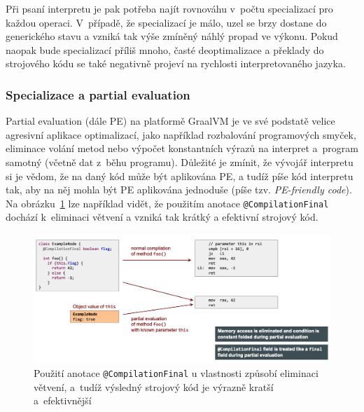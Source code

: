 \documentclass[
  master,
  biblatex,
  figures=true,
  theorems,
  sourcecodes,
  glossaries,
  index
]{kidiplom}
\begin{document}
Při psaní interpretu je pak potřeba najít rovnováhu v~počtu specializací pro každou operaci. V~případě, že specializací je málo, uzel se brzy dostane do generického stavu a vzniká tak výše zmíněný náhlý propad ve výkonu. Pokud naopak bude specializací příliš mnoho, časté deoptimalizace a překlady do strojového kódu se také negativně projeví na rychlosti interpretovaného jazyka.

\newpage


\subsubsection{Specializace a partial evaluation}
Partial evaluation (dále PE) na platformě GraalVM je ve své podstatě velice agresivní aplikace optimalizací, jako například rozbalování programových smyček, eliminace volání metod nebo výpočet konstantních výrazů na interpret a~program samotný (včetně dat z~běhu programu). Důležité je zmínit, že vývojář interpretu si je vědom, že na daný kód může být aplikována PE, a tudíž píše kód interpretu tak, aby na něj mohla být PE aplikována jednoduše (píše tzv. \textit{PE-friendly code}). Na obrázku~\ref{fig:pe-example-1} lze například vidět, že použitím anotace \texttt{@CompilationFinal} dochází k~eliminaci větvení a vzniká tak krátký a efektivní strojový kód. 

\begin{figure} [h]
    \centering
    \includegraphics[width= 1\textwidth]{images/pe-exampke-1.png}
    \caption{Použití anotace \texttt{@CompilationFinal} u vlastnosti způsobí eliminaci větvení, a~tudíž výsledný strojový kód je výrazně kratší a~efektivnější \cite{truffle-pe-presentation}}
    \label{fig:pe-example-1}
\end{figure}
\end{document}
